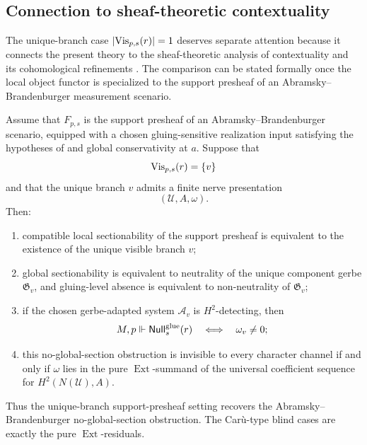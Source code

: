 \subsection{Connection to sheaf-theoretic contextuality}

The unique-branch case $|\mathrm{Vis}_{p,s}(r)|=1$ deserves separate attention because it connects the present theory to the sheaf-theoretic analysis of contextuality and its cohomological refinements \cite{AbramskyBrandenburger2011,AbramskyMansfieldBarbosa2012,AbramskyBarbosaKishidaLalMansfield2015,Caru2017}. The comparison can be stated formally once the local object functor is specialized to the support presheaf of an Abramsky--Brandenburger measurement scenario.

\begin{theorem}\label{thm:unique-branch-contextuality-comparison}
Assume that $F_{p,s}$ is the support presheaf of an
Abramsky--Brandenburger scenario, equipped with a chosen gluing-sensitive
realization input satisfying the hypotheses of
 and global conservativity at $a$. Suppose
that
\[
\mathrm{Vis}_{p,s}(r)=\{v\}
\]
and that the unique branch $v$ admits a finite nerve presentation
\[
(\mathcal U,A,\omega).
\]
Then:
\begin{enumerate}[label=(\roman*),nosep]
\item compatible local sectionability of the support presheaf is equivalent to
the existence of the unique visible branch $v$;
\item global sectionability is equivalent to neutrality of the unique component
gerbe $\mathfrak G_v$, and gluing-level absence is equivalent to
non-neutrality of $\mathfrak G_v$;
\item if the chosen gerbe-adapted system $\mathcal A_v$ is $H^2$-detecting,
then
\[
M,p\Vdash \mathsf{Null}^{\mathrm{glue}}_s(r)
\quad\Longleftrightarrow\quad
\omega_v\neq 0;
\]
\item this no-global-section obstruction is invisible to every character
channel if and only if $\omega$ lies in the pure $\operatorname{Ext}$-summand
of the universal coefficient sequence for $H^2(N(\mathcal U),A)$.
\end{enumerate}
Thus the unique-branch support-presheaf setting recovers the
Abramsky--Brandenburger no-global-section obstruction. The Car\`u-type blind
cases are exactly the pure $\operatorname{Ext}$-residuals.
\end{theorem}

